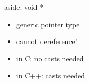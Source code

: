 \begin{frame}{aside: void *}
\begin{itemize}
    \item generic pointer type
    \item cannot dereference!
    \item in C: no casts needed 
    \item in C++: casts needed
\end{itemize}
\end{frame}
